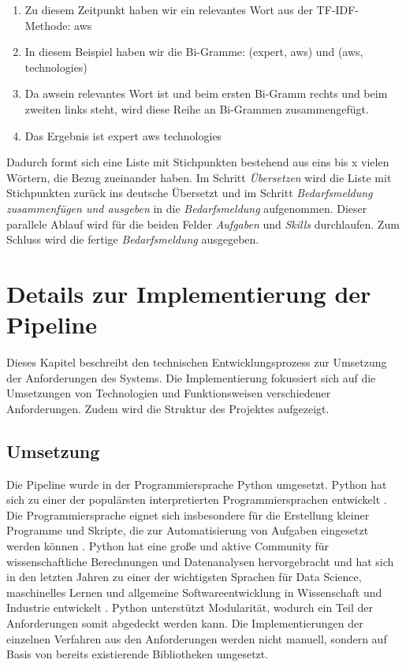 \begin{enumerate}
	\item Zu diesem Zeitpunkt haben wir ein relevantes Wort aus der TF-IDF-Methode: \grqq aws\grqq
	\item In diesem Beispiel haben wir die Bi-Gramme: (\grqq expert\grqq, \grqq aws\grqq) und (\grqq aws\grqq, \grqq technologies\grqq)
	\item Da \grqq aws\grqq ein relevantes Wort ist und beim ersten Bi-Gramm rechts und beim zweiten links steht, wird diese Reihe an Bi-Grammen zusammengefügt.
	\item Das Ergebnis ist \grqq expert aws technologies\grqq
\end{enumerate}
Dadurch formt sich eine Liste mit Stichpunkten bestehend aus eins bis x vielen Wörtern, die Bezug zueinander haben. Im Schritt \emph{Übersetzen} wird die Liste mit Stichpunkten zurück ins deutsche Übersetzt und im Schritt \emph{Bedarfsmeldung zusammenfügen und ausgeben} in die \emph{Bedarfsmeldung} aufgenommen. Dieser parallele Ablauf wird für die beiden Felder \emph{Aufgaben} und \emph{Skills} durchlaufen. Zum Schluss wird die fertige \emph{Bedarfsmeldung} ausgegeben.
\section{Details zur Implementierung der Pipeline}
Dieses Kapitel beschreibt den technischen Entwicklungsprozess zur Umsetzung der Anforderungen des Systems. Die Implementierung fokussiert sich auf die Umsetzungen von Technologien und Funktionsweisen verschiedener Anforderungen. Zudem wird die Struktur des Projektes aufgezeigt.
\subsection{Umsetzung}
Die Pipeline wurde in der Programmiersprache Python umgesetzt. Python hat sich zu einer der populärsten interpretierten Programmiersprachen entwickelt \cite{mckinney2012python}. Die Programmiersprache eignet sich insbesondere für die Erstellung kleiner Programme und Skripte, die zur Automatisierung von Aufgaben eingesetzt werden können \cite{mckinney2012python}. Python hat eine große und aktive Community für wissenschaftliche Berechnungen und Datenanalysen hervorgebracht und hat sich in den letzten Jahren zu einer der wichtigsten Sprachen für Data Science, maschinelles Lernen und allgemeine Softwareentwicklung in Wissenschaft und Industrie entwickelt \cite{mckinney2012python}. Python unterstützt Modularität, wodurch ein Teil der Anforderungen somit abgedeckt werden kann. Die Implementierungen der einzelnen Verfahren aus den Anforderungen werden nicht manuell, sondern auf Basis von bereits existierende Bibliotheken umgesetzt.
